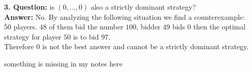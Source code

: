 \begin{example}
	\textbf{3. Question:} is $(0, \dotsc, 0)$ also a strictly dominant strategy? \\
	\textbf{Answer:} No. By analyzing the following situation we find a counterexample: \\
	$50$ players. $48$ of them bid the number $100$, bidder $49$ bids $0$ then the optimal strategy for player $50$ is to bid $97$. \\
	Therefore $0$ is not the best answer and cannot be a strictly dominant strategy.
\end{example}

\begin{example}
	something is missing in my notes here %
\end{example}

\newpage